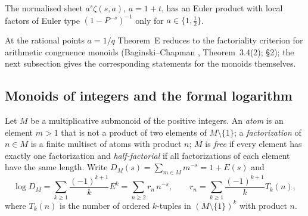 \begin{corollary}\label{cor:eulerian}
The normalised sheet $a^s\zeta(s,a)$, $a=1+t$, has an Euler product with local factors of Euler type $(1-P^{-s})^{-1}$ only for $a\in\{1,\tfrac12\}$.
\end{corollary}

At the rational points $a=1/q$ Theorem~E reduces to the factoriality criterion for arithmetic congruence monoids (Baginski--Chapman \cite{BaginskiChapman}, Theorem~3.4(2);  §2); the next subsection gives the corresponding statements for the monoids themselves.

\subsection{Monoids of integers and the formal logarithm}

Let $M$ be a multiplicative submonoid of the positive integers.
An \emph{atom} is an element $m>1$ that is not a product of two elements of $M\setminus\{1\}$; a \emph{factorization} of $n\in M$ is a finite multiset of atoms with product $n$; $M$ is \emph{free} if every element has exactly one factorization and \emph{half-factorial} if all factorizations of each element have the same length.
Write $D_M(s)=\sum_{m\in M}m^{-s}=1+E(s)$ and
\[
\log D_M=\sum_{k\ge1}\frac{(-1)^{k+1}}{k}E^k=\sum_{n\ge2}r_n\,n^{-s},\qquad r_n=\sum_{k\ge1}\frac{(-1)^{k+1}}{k}T_k(n),
\]
where $T_k(n)$ is the number of ordered $k$-tuples in $(M\setminus\{1\})^k$ with product $n$.

